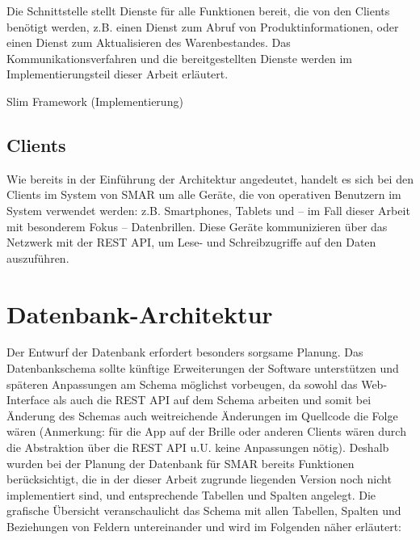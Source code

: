 Die Schnittstelle stellt Dienste für alle Funktionen bereit, die von den Clients benötigt werden, z.B. einen Dienst zum Abruf von Produktinformationen, oder einen Dienst zum Aktualisieren des Warenbestandes. Das Kommunikationsverfahren und die bereitgestellten Dienste werden im Implementierungsteil dieser Arbeit erläutert.


Slim Framework (Implementierung)

\subsection{Clients}

Wie bereits in der Einführung der Architektur angedeutet, handelt es sich bei den Clients im System von SMAR um alle Geräte, die von operativen Benutzern im System verwendet werden: z.B. Smartphones, Tablets und -- im Fall dieser Arbeit mit besonderem Fokus -- Datenbrillen. Diese Geräte kommunizieren über das Netzwerk mit der REST API, um Lese- und Schreibzugriffe auf den Daten auszuführen.

\section{Datenbank-Architektur}
\label{sec:architektur_datenbank}

Der Entwurf der Datenbank erfordert besonders sorgsame Planung. Das Datenbankschema sollte künftige Erweiterungen der Software unterstützen und späteren Anpassungen am Schema möglichst vorbeugen, da sowohl das Web-Interface als auch die REST API auf dem Schema arbeiten und somit bei Änderung des Schemas auch weitreichende Änderungen im Quellcode die Folge wären (Anmerkung: für die App auf der Brille oder anderen Clients wären durch die Abstraktion über die REST API u.U. keine Anpassungen nötig).
Deshalb wurden bei der Planung der Datenbank für SMAR bereits Funktionen berücksichtigt, die in der dieser Arbeit zugrunde liegenden Version noch nicht implementiert sind, und entsprechende Tabellen und Spalten angelegt. Die grafische Übersicht veranschaulicht das Schema mit allen Tabellen, Spalten und Beziehungen von Feldern untereinander und wird im Folgenden näher erläutert:

